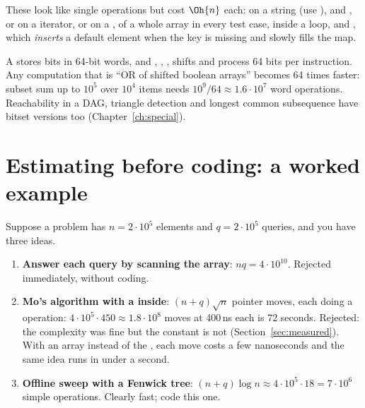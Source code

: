 \begin{pitfall}
These look like single operations but cost $\Oh{n}$ each:  on a string (use ),
 and ,  or  on a  iterator,
 or  on a ,  of a whole array in every test case,  inside a loop,
and , which \emph{inserts} a default element when the key is missing and slowly fills the map.
\end{pitfall}

\begin{trick}
A  stores bits in 64-bit words, and \cc{&}, \cc{|}, \cc{^}, shifts and  process 64 bits per
instruction. Any computation that is ``OR of shifted boolean arrays'' becomes 64 times faster: subset sum up to $10^5$ over
$10^4$ items needs $10^9/64 \approx 1.6\cdot10^7$ word operations. Reachability in a DAG, triangle detection and
longest common subsequence have bitset versions too (Chapter~\ref{ch:special}).
\end{trick}

\section[Estimating before coding]{Estimating before coding: a worked example \hfill \silver}\label{sec:estimate}

Suppose a problem has $n = 2 \cdot 10^5$ elements and $q = 2 \cdot 10^5$ queries, and you have three ideas.

\begin{enumerate}
  \item \textbf{Answer each query by scanning the array}: $nq = 4 \cdot 10^{10}$. Rejected immediately, without coding.
  \item \textbf{Mo's algorithm with a  inside}: $(n + q)\sqrt n$ pointer moves, each doing a  operation:
        $4\cdot10^5 \cdot 450 \approx 1.8\cdot 10^8$ moves at 400\,ns each is 72 seconds. Rejected: the complexity was
        fine but the constant is not (Section~\ref{sec:measured}). With an array instead of the , each move costs
        a few nanoseconds and the same idea runs in under a second.
  \item \textbf{Offline sweep with a Fenwick tree}: $(n + q)\log n \approx 4\cdot10^5 \cdot 18 = 7\cdot10^6$ simple
        operations. Clearly fast; code this one.
\end{enumerate}


